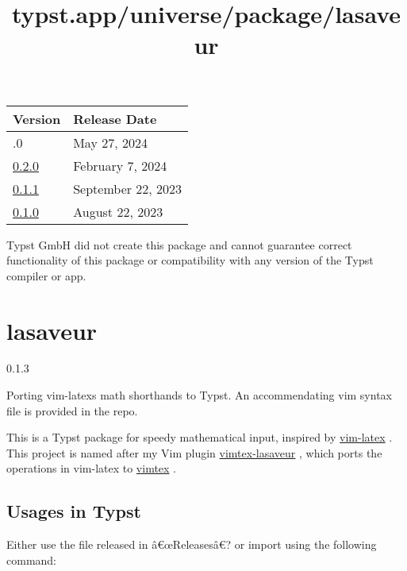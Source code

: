 \begin{longtable}[]{@{}ll@{}}
\toprule\noalign{}
Version & Release Date \\
\midrule\noalign{}
\endhead
\bottomrule\noalign{}
\endlastfoot
0.3.0 & May 27, 2024 \\
\href{https://typst.app/universe/package/metro/0.2.0/}{0.2.0} & February
7, 2024 \\
\href{https://typst.app/universe/package/metro/0.1.1/}{0.1.1} &
September 22, 2023 \\
\href{https://typst.app/universe/package/metro/0.1.0/}{0.1.0} & August
22, 2023 \\
\end{longtable}

Typst GmbH did not create this package and cannot guarantee correct
functionality of this package or compatibility with any version of the
Typst compiler or app.


\title{typst.app/universe/package/lasaveur}

\label{banner}
\section{lasaveur}\label{lasaveur}

{ 0.1.3 }

Porting vim-latex\textquotesingle s math shorthands to Typst. An
accommendating vim syntax file is provided in the repo.

\label{readme}
This is a Typst package for speedy mathematical input, inspired by
\href{https://github.com/vim-latex/vim-latex}{vim-latex} . This project
is named after my Vim plugin
\href{https://github.com/yangwenbo99/vimtex-lasaveur}{vimtex-lasaveur} ,
which ports the operations in vim-latex to
\href{https://github.com/lervag/vimtex}{vimtex} .

\subsection{Usages in Typst}\label{usages-in-typst}

Either use the file released in â€œReleasesâ€? or import using the
following command:

\begin{Shaded}
\begin{Highlighting}[]
\end{Highlighting}
\end{Shaded}

